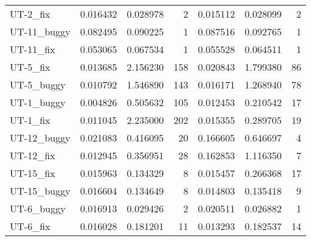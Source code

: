 \documentclass[12pt]{article}
\begin{document}
\begin{tabular}{lrrrrrr}
 UT-2\_fix    &             0.016432 &              0.028978 &               2 &             0.015112 &              0.028099 &               2 \\
 UT-11\_buggy &             0.082495 &              0.090225 &               1 &             0.087516 &              0.092765 &               1 \\
 UT-11\_fix   &             0.053065 &              0.067534 &               1 &             0.055528 &              0.064511 &               1 \\
 UT-5\_fix    &             0.013685 &              2.156230 &             158 &             0.020843 &              1.799380 &              86 \\
 UT-5\_buggy  &             0.010792 &              1.546890 &             143 &             0.016171 &              1.268940 &              78 \\
 UT-1\_buggy  &             0.004826 &              0.505632 &             105 &             0.012453 &              0.210542 &              17 \\
 UT-1\_fix    &             0.011045 &              2.235000 &             202 &             0.015355 &              0.289705 &              19 \\
 UT-12\_buggy &             0.021083 &              0.416095 &              20 &             0.166605 &              0.646697 &               4 \\
 UT-12\_fix   &             0.012945 &              0.356951 &              28 &             0.162853 &              1.116350 &               7 \\
 UT-15\_fix   &             0.015963 &              0.134329 &               8 &             0.015457 &              0.266368 &              17 \\
 UT-15\_buggy &             0.016604 &              0.134649 &               8 &             0.014803 &              0.135418 &               9 \\
 UT-6\_buggy  &             0.016913 &              0.029426 &               2 &             0.020511 &              0.026882 &               1 \\
 UT-6\_fix    &             0.016028 &              0.181201 &              11 &             0.013293 &              0.182537 &              14 \\
\bottomrule
\end{tabular}
\end{document}
